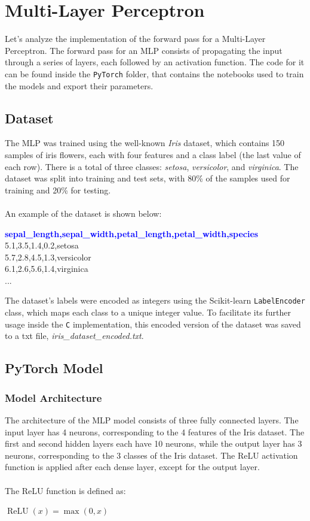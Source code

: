 \documentclass{article}
\begin{document}
\section{Multi-Layer Perceptron}
Let's analyze the implementation of the forward pass for a Multi-Layer Perceptron. The forward pass for an MLP consists of propagating the input through a series of layers, each followed by an activation function.
The code for it can be found inside the \texttt{PyTorch} folder, that contains the notebooks used to train the models and export their parameters.

\subsection{Dataset}
The MLP was trained using the well-known \textit{Iris} dataset, which contains 150 samples of iris flowers, each with four features and a class label (the last value of each row).
There is a total of three classes: \textit{setosa}, \textit{versicolor}, and \textit{virginica}.
The dataset was split into training and test sets, with 80\% of the samples used for training and 20\% for testing.
\\\\An example of the dataset is shown below:

\begin{tcolorbox}[colback=gray!5, colframe=black, rounded corners, boxrule=0.1mm]
\textbf{\textcolor{blue}{sepal\_length,sepal\_width,petal\_length,petal\_width,species}} \\
5.1,3.5,1.4,0.2,setosa \\
5.7,2.8,4.5,1.3,versicolor \\
6.1,2.6,5.6,1.4,virginica \\
...
\end{tcolorbox}

The dataset's labels were encoded as integers using the Scikit-learn \texttt{LabelEncoder} class, which maps each class to a unique integer value. To facilitate its further usage inside the \texttt{C} implementation, this encoded version of the dataset was saved to a txt file, \textit{iris\_dataset\_encoded.txt}.

\subsection{PyTorch Model}
\subsubsection{Model Architecture}
The architecture of the MLP model consists of three fully connected layers.  
The input layer has 4 neurons, corresponding to the 4 features of the Iris dataset. 
The first and second hidden layers each have 10 neurons, while the output layer has 3 neurons, corresponding to the 3 classes of the Iris dataset.  
The ReLU activation function is applied after each dense layer, except for the output layer.  
\\\\The ReLU function is defined as:  
\begin{center}
$\operatorname{ReLU}(x) = \max(0, x)$
\end{center}
\end{document}
